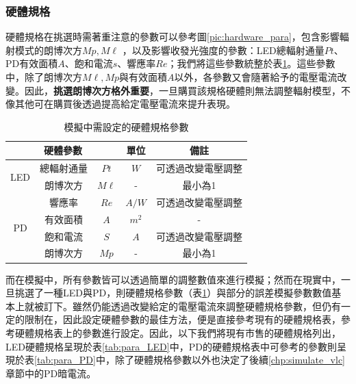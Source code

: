\subsubsection{硬體規格}

硬體規格在挑選時需著重注意的參數可以參考圖\ref{pic:hardware_para}，包含影響輻射模式的朗博次方$Mp,M\ell$
，以及影響收發光強度的參數：LED總輻射通量$Pt$、PD有效面積$A$、飽和電流$s$、響應率$Re$；我們將這些參數統整於表\ref{tab:para_hardware}。這些參數中，除了朗博次方$M\ell,Mp$與有效面積$A$以外，各參數又會隨著給予的電壓電流改變。因此，\textbf{挑選朗博次方格外重要}，一旦購買該規格硬體則無法調整輻射模型，不像其他可在購買後透過提高給定電壓電流來提升表現。

\begin{table}[htpb]
\renewcommand{\arraystretch}{1.3}
\setlength{\arrayrulewidth}{0.15mm}
\setlength{\doublerulesep}{0.12mm}
\caption{模擬中需設定的硬體規格參數}
\label{tab:para_hardware}
\centering
\begin{tabular}{|c|cc|c|c|}
\hline
\multicolumn{3}{|c|}{\textbf{硬體參數}}  &\textbf{單位}  &  \textbf{備註}   \\
\hline
\multirow{2}{*}{LED} 
& 總輻射通量 &$Pt$ & $W$ & 可透過改變電壓調整 \\
 & 朗博次方& $M\ell$& -  & 最小為1 \\\hline
\multirow{4}{*}{PD} 
& 響應率 &$Re$ & $A/W$ & 可透過改變電壓調整 \\
& 有效面積& $A$& $m^2$ & - \\
& 飽和電流& $S$& $A$ & 可透過改變電壓調整 \\
& 朗博次方& $Mp$& -  & 最小為1 \\\hline
\end{tabular}
\end{table}

而在模擬中，所有參數皆可以透過簡單的調整數值來進行模擬；然而在現實中，一旦挑選了一種LED與PD，則硬體規格參數（表\ref{tab:para_hardware}）與部分的誤差模擬參數數值基本上就被訂下。雖然仍能透過改變給定的電壓電流來調整硬體規格參數，但仍有一定的限制在，因此設定硬體參數的最佳方法，便是直接參考現有的硬體規格表，參考硬體規格表上的參數進行設定。因此，以下我們將現有市售的硬體規格列出，LED硬體規格呈現於表\ref{tab:para_LED}中，PD的硬體規格表中可參考的參數則呈現於表\ref{tab:para_PD}中，除了硬體規格參數以外也決定了後續\ref{chp:simulate_vlc}章節中的PD暗電流。

